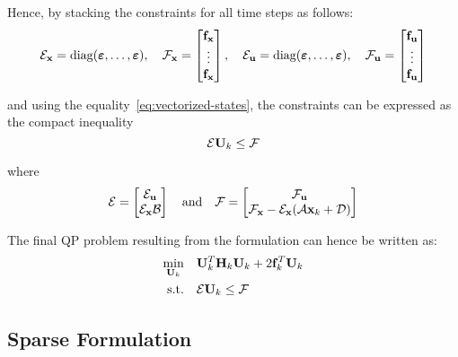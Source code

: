 \documentclass[../main.tex]{subfiles}
\begin{document}
Hence, by stacking the constraints for all time steps as follows:
\begin{equation*}
	\mathcal{E}_{\mathbf{x}} = \text{diag}(\boldsymbol{\varepsilon}, \ldots,
	\boldsymbol{\varepsilon}), 
	\quad
	\mathcal{F}_{\mathbf{x}} = \begin{bmatrix}
		\mathbf{f}_{\mathbf{x}}\\
		\vdots\\
		\mathbf{f}_{\mathbf{x}}
	\end{bmatrix},
	\quad
	\mathcal{E}_{\mathbf{u}} = \text{diag}(\boldsymbol{\varepsilon}, \ldots,
	\boldsymbol{\varepsilon}), 
	\quad
	\mathcal{F}_{\mathbf{u}} = \begin{bmatrix}
		\mathbf{f}_{\mathbf{u}}\\
		\vdots\\
		\mathbf{f}_{\mathbf{u}}
	\end{bmatrix}
\end{equation*}

and using the equality~\ref{eq:vectorized-states}, the constraints can be
expressed as the compact inequality
\begin{equation*}
	\mathcal{E} \mathbf{U}_k \leq \mathcal{F}
\end{equation*}

where
\begin{equation*}
	\mathcal{E} = \begin{bmatrix}
		\mathcal{E}_{\mathbf{u}}\\
		\mathcal{E}_{\mathbf{x}} \mathcal{B}
	\end{bmatrix}
	\quad \text{and} \quad
	\mathcal{F} = \begin{bmatrix}
		\mathcal{F}_{\mathbf{u}}\\
		\mathcal{F}_{\mathbf{x}} - \mathcal{E}_{\mathbf{x}} (\mathcal{A} \mathbf{x}_k + \mathcal{D})
	\end{bmatrix}
\end{equation*}

The final QP problem resulting from the  formulation can hence be
written as:
\begin{equation}
	\begin{aligned}
		\min_{\mathbf{U}_k} \quad & \mathbf{U}_k^T \mathbf{H}_k \mathbf{U}_k + 2 \mathbf{f}_k^T
		\mathbf{U}_k\\
		\text{s.t.} \quad & \mathcal{E} \mathbf{U}_k \leq \mathcal{F}
	\end{aligned}
\end{equation}

\pagebreak
\subsection{Sparse Formulation}\label{app:sparse-formulation}
\end{document}
